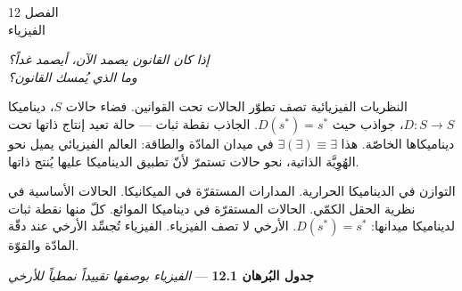 \documentclass[10pt, openany, oneside]{book}
\renewcommand{\large}{\fontsize{11.5}{14}\selectfont}
\renewcommand{\huge}{\fontsize{17}{21}\selectfont}
\begin{document}
%
%
%

\newpage

\begin{center}
    {\huge الفصل 12}\\[0.3em]
    {\large الفيزياء}
\end{center}

\vspace{1.5em}

\begin{center}
    \itshape
    إذا كان القانون يصمد الآن، أيصمد غداً؟\\
    وما الذي يُمسك القانون؟
\end{center}

\vspace{2em}


\noindent النظريات الفيزيائية تصف تطوّر الحالات تحت القوانين. فضاء حالات $S$، ديناميكا $D: S \to S$، جواذب حيث $D(s^*) = s^*$. الجاذب نقطة ثبات --- حالة تعيد إنتاج ذاتها تحت ديناميكاها الخاصّة. هذا $\exists(\exists) \equiv \exists$ في ميدان المادّة والطاقة: العالم الفيزيائي يميل نحو الهُوِيَّة الذاتية، نحو حالات تستمرّ لأنّ تطبيق الديناميكا عليها يُنتج ذاتها.

التوازن في الديناميكا الحرارية. المدارات المستقرّة في الميكانيكا. الحالات الأساسية في نظرية الحقل الكمّي. الحالات المستقرّة في ديناميكا الموائع. كلّ منها نقطة ثبات لديناميكا ميدانها: $D(s^*) = s^*$. الأرخي لا تصف الفيزياء. الفيزياء تُجسِّد الأرخي عند دقّة المادّة والقوّة.

\vspace{0.5em}

\textbf{جدول البُرهان 12.1} --- \textit{الفيزياء بوصفها تقييداً نمطياً للأرخي}

\vspace{0.5em}
\end{document}

